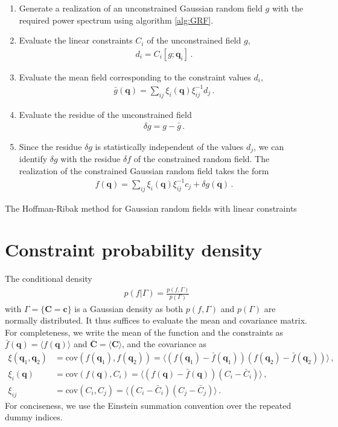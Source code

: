 \documentclass[a4paper, 11pt]{article}
\begin{document}
\begin{algorithm}[H]
\SetAlgoLined
\begin{enumerate}[itemsep=1ex, leftmargin=0cm, rightmargin=1cm]
\item Generate a realization of an unconstrained Gaussian random field $g$ with the required power spectrum using algorithm \ref{alg:GRF}.
\item Evaluate the linear constraints $C_i$ of the unconstrained field $g$,
\begin{align}
d_i = C_i[g;\bm{q}_i]\,.
\end{align} 
\item Evaluate the mean field corresponding to the constraint values $d_i$,
\begin{align}
\bar{g}(\bm{q}) = \sum_{ij}\xi_i(\bm{q}) \xi^{-1}_{ij} d_j\,.
\end{align}
\item Evaluate the residue of the unconstrained field 
\begin{align}
\delta g=g - \bar{g}\,.
\end{align}
\item Since the residue $\delta g$ is statistically independent of the values $d_j$, we can identify $\delta g$ with the residue $\delta f$ of the constrained random field. The realization of the constrained Gaussian random field takes the form
\begin{align}
f(\bm{q}) = \sum_{ij}\xi_i(\bm{q}) \xi^{-1}_{ij} c_j + \delta g(\bm{q})\,.
\end{align}
\end{enumerate}
 \caption{The Hoffman-Ribak method for Gaussian random fields with linear constraints}
 \label{alg:HoffmanRibak}
\end{algorithm}


\section{Constraint probability density}\label{ap:constraintDensity}
The conditional density 
\begin{align}
p(f|\Gamma) =\frac{p(f, \Gamma)}{p(\Gamma)}
\end{align}
with $\Gamma = \{\bm{C} = \bm{c}\}$ is a Gaussian density as both $p(f,\Gamma)$ and $p(\Gamma)$ are normally distributed. It thus suffices to evaluate the mean and covariance matrix. For completeness, we write the mean of the function and the constraints as $\bar{f}(\bm{q})=\langle f(\bm{q}) \rangle$ and $\bar{\bm{C}}=\langle \bm{C}\rangle$, and the covariance as
\begin{align}
\xi(\bm{q}_1,\bm{q}_2)& = \text{cov}(f(\bm{q}_1),f(\bm{q}_2))= \langle (f(\bm{q}_1) - \bar{f}(\bm{q}_1))(f(\bm{q}_2) - \bar{f}(\bm{q}_2))\rangle\,,\\
\xi_i(\bm{q}) &= \text{cov}(f(\bm{q}),C_i) = \langle (f(\bm{q})-\bar{f}(\bm{q}))(C_i - \bar{C}_i)\rangle\,,\\
\xi_{ij} &= \text{cov}(C_i,C_j) = \langle (C_i - \bar{C}_i)(C_j-\bar{C}_j)\rangle\,.
\end{align}
For conciseness, we use the Einstein summation convention over the repeated dummy indices.
\end{document}
